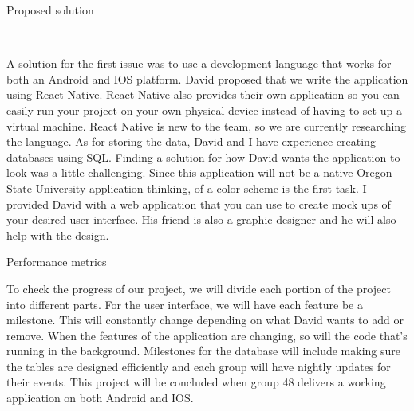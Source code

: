 \documentclass[10pt]{article}
\begin{document}
	\vspace{1\baselineskip}
\centerline{Proposed solution}
	\vspace{1\baselineskip}\
	
	\tab A solution for the first issue was to use a development language that works for both an Android and IOS platform. David proposed that we write the application using React Native. React Native also provides their own application so you can easily run your project on your own physical device instead of having to set up a virtual machine. React Native is new to the team, so we are currently researching the language. As for storing the data, David and I have experience creating databases using SQL. Finding a solution for how David wants the application to look was a little challenging. Since this application will not be a native Oregon State University application thinking, of a color scheme is the first task. I provided David with a web application that you can use to create mock ups of your desired user interface. His friend is also a graphic designer and he will also help with the design. 
	
	\vspace{1\baselineskip}
\centerline{Performance metrics}
	\vspace{1\baselineskip}
	
	\tab To check the progress of our project, we will divide each portion of the project into different parts. For the user interface, we will have each feature be a milestone. This will constantly change depending on what David wants to add or remove. When the features of the application are changing, so will the code that’s running in the background. Milestones for the database will include making sure the tables are designed efficiently and each group will have nightly updates for their events. This project will be concluded when group 48 delivers a working application on both Android and IOS.  
\end{document}
